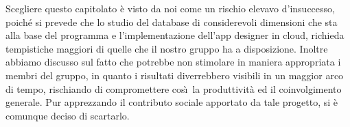 Scegliere questo capitolato \`e visto da noi come un rischio elevavo
d'insuccesso, poich\'e si prevede che lo studio del database di considerevoli
dimensioni che sta alla base del programma e l'implementazione dell'app
designer in cloud, richieda tempistiche maggiori di quelle che il
nostro gruppo ha a disposizione. Inoltre abbiamo discusso sul fatto
che potrebbe non stimolare in maniera appropriata i membri del gruppo, in quanto
i risultati diverrebbero visibili in un maggior arco di tempo, rischiando di
compromettere cos\`\i\ la produttivit\`a ed il coinvolgimento generale. Pur
apprezzando il contributo sociale apportato da tale progetto, si \`e comunque
deciso di scartarlo.

